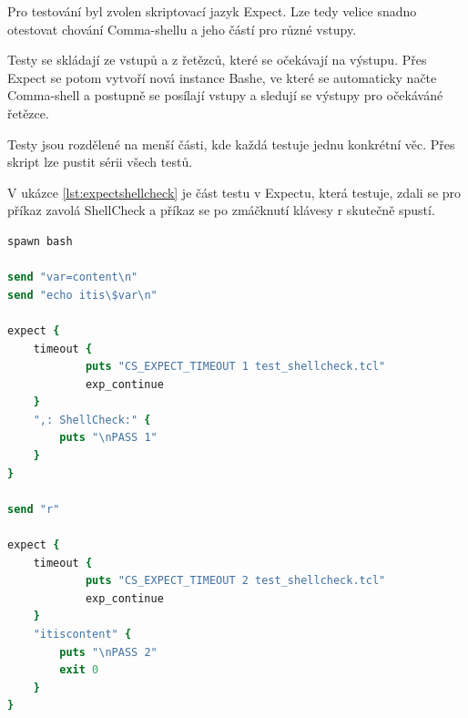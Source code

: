 \documentclass[thesis=M,czech]{FITthesis}[2012/06/26]
\begin{document}
Pro testování byl zvolen skriptovací jazyk Expect. Lze tedy velice snadno otestovat chování Comma-shellu a jeho částí pro různé vstupy.

Testy se skládají ze vstupů a z řetězců, které se očekávají na výstupu. Přes Expect se potom vytvoří nová instance Bashe, ve které se automaticky načte Comma-shell a postupně se posílají vstupy a sledují se výstupy pro očekáváné řetězce.

Testy jsou rozdělené na menší části, kde každá testuje jednu konkrétní věc. Přes skript lze pustit sérii všech testů.

V ukázce \ref{lst:expectshellcheck} je část testu v Expectu, která testuje, zdali se pro příkaz zavolá ShellCheck a příkaz se po zmáčknutí klávesy r skutečně spustí.


\begin{minipage}{\linewidth}
\begin{lstlisting}[language=tcl, caption={Expect test}, label={lst:expectshellcheck}]
spawn bash

send "var=content\n"
send "echo itis\$var\n"

expect {
	timeout {
			puts "CS_EXPECT_TIMEOUT 1 test_shellcheck.tcl"
			exp_continue
	}
	",: ShellCheck:" {
		puts "\nPASS 1"
	}
}

send "r"

expect {
	timeout {
			puts "CS_EXPECT_TIMEOUT 2 test_shellcheck.tcl"
			exp_continue
	}
	"itiscontent" {
		puts "\nPASS 2"
		exit 0
	}
}
\end{lstlisting}
\end{minipage}





\end{document}
